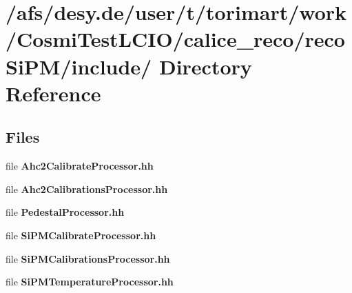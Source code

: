 \section{/afs/desy.de/user/t/torimart/work/CosmiTestLCIO/calice\_\-reco/recoSiPM/include/ Directory Reference}
\label{dir_c3d352f5158c78b0c23f5f807db2ef1c}
\subsection*{Files}
\begin{DoxyCompactItemize}
\item 
file {\bfseries Ahc2CalibrateProcessor.hh}
\item 
file {\bfseries Ahc2CalibrationsProcessor.hh}
\item 
file {\bfseries PedestalProcessor.hh}
\item 
file {\bfseries SiPMCalibrateProcessor.hh}
\item 
file {\bfseries SiPMCalibrationsProcessor.hh}
\item 
file {\bfseries SiPMTemperatureProcessor.hh}
\end{DoxyCompactItemize}
